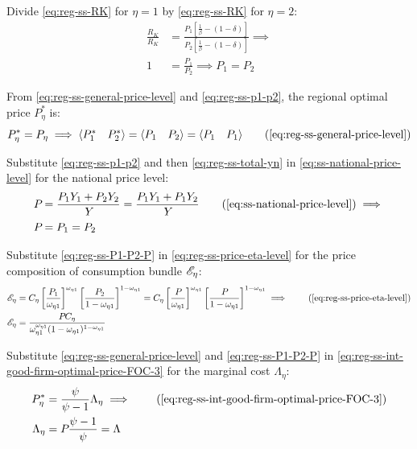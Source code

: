 \documentclass[../thesis.tex]{subfiles}
\begin{document}
	Divide \ref{eq:reg-ss-RK} for $\eta = 1$ by \ref{eq:reg-ss-RK} for $\eta = 2$:
	\begin{align}
		\frac{R_K}{R_K} &= \frac{P_{1} \left[ \frac{1}{\beta} - (1-\delta) \right]}{P_{2} \left[ \frac{1}{\beta} - (1-\delta) \right]} \implies \nonumber \\
		1 &= \frac{P_{1}}{P_{2}} \implies P_{1} = P_{2} \label{eq:reg-ss-p1-p2}
	\end{align}

From \ref{eq:reg-ss-general-price-level} and \ref{eq:reg-ss-p1-p2}, the regional optimal price $P_{\eta}^{\ast}$ is:
\begin{align}
	P_{\eta}^{\ast} = P_{\eta} \implies \langle \begin{matrix} P_{1}^{\ast} & P_{2}^{\ast} \end{matrix} \rangle = \langle \begin{matrix} P_{1} & P_{2} \end{matrix} \rangle = \langle \begin{matrix} P_{1} & P_{1} \end{matrix} \rangle \tag{\ref{eq:reg-ss-general-price-level}}
\end{align}

Substitute \ref{eq:reg-ss-p1-p2} and then \ref{eq:reg-ss-total-yn} in \ref{eq:ss-national-price-level} for the national price level:
	\begin{align}
		P_{} &= \frac{P_{1} Y_{1} + P_{2} Y_{2}}{Y_{}} = \frac{P_{1} Y_{1} + P_{1} Y_{2}}{Y_{}} \tag{\ref{eq:ss-national-price-level}} \implies \nonumber \\
		P_{} &= P_{1} = P_{2} \label{eq:reg-ss-P1-P2-P}
	\end{align}

Substitute \ref{eq:reg-ss-P1-P2-P} in \ref{eq:reg-ss-price-eta-level} for the price composition of consumption bundle $\te[]$:
\begin{align}
	\te[] &= C_{\eta} \left[ \frac{P_{1}}{\omega_{\eta 1}} \right]^{\omega_{\eta 1}} \left[ \frac{P_{2}}{1 -\omega_{\eta 1}} \right]^{1 -\omega_{\eta 1}} = C_{\eta} \left[ \frac{P_{}}{\omega_{\eta 1}} \right]^{\omega_{\eta 1}} \left[ \frac{P_{}}{1 -\omega_{\eta 1}} \right]^{1 -\omega_{\eta 1}} \implies \tag{\ref{eq:reg-ss-price-eta-level}} \\
	\te[] &= \frac{P_{} C_{\eta}}{\omega_{\eta 1}^{\omega_{\eta 1}} (1 -\omega_{\eta 1})^{1 -\omega_{\eta 1}}} \label{eq:reg-ss-te}
\end{align}

Substitute \ref{eq:reg-ss-general-price-level} and \ref{eq:reg-ss-P1-P2-P} in \ref{eq:reg-ss-int-good-firm-optimal-price-FOC-3} for the marginal cost $\Lambda_{\eta}$:
\begin{align}
	P_{\eta}^{\ast} &= \frac{\psi}{\psi-1} \Lambda_{\eta} \implies \tag{\ref{eq:reg-ss-int-good-firm-optimal-price-FOC-3}} \\
	\Lambda_{\eta} &= P_{} \frac{\psi-1}{\psi} = \Lambda_{} \label{eq:reg-ss-marginal-cost}
\end{align}
\end{document}
